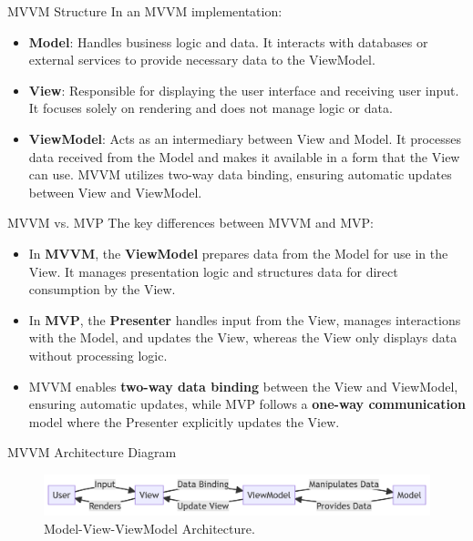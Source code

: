 \documentclass[aspectratio=169, table]{beamer}
\begin{document}
\begin{frame}[fragile]{MVVM Structure}
	\vspace{20pt}
	In an MVVM implementation:
	\begin{itemize}
		\item \textbf{Model}: Handles business logic and data. It interacts with databases or external services to provide necessary data to the ViewModel.
		\item \textbf{View}: Responsible for displaying the user interface and receiving user input. It focuses solely on rendering and does not manage logic or data.
		\item \textbf{ViewModel}: Acts as an intermediary between View and Model. It processes data received from the Model and makes it available in a form that the View can use. MVVM utilizes two-way data binding, ensuring automatic updates between View and ViewModel.
	\end{itemize}
\end{frame}

\begin{frame}[fragile]{MVVM vs. MVP}
	\vspace{20pt}
	The key differences between MVVM and MVP:
	\begin{itemize}
		\item In \textbf{MVVM}, the \textbf{ViewModel} prepares data from the Model for use in the View. It manages presentation logic and structures data for direct consumption by the View.
		\item In \textbf{MVP}, the \textbf{Presenter} handles input from the View, manages interactions with the Model, and updates the View, whereas the View only displays data without processing logic.
		\item MVVM enables \textbf{two-way data binding} between the View and ViewModel, ensuring automatic updates, while MVP follows a \textbf{one-way communication} model where the Presenter explicitly updates the View.
	\end{itemize}
\end{frame}

\begin{frame}[fragile]{MVVM Architecture Diagram}
	\vspace{20pt}
	\begin{figure}[h]
		\centering
		\includegraphics[width=\textwidth]{../images/mvvm.png}
		\caption{Model-View-ViewModel Architecture.}
		\label{fig:mvvm-architecture}
	\end{figure}
\end{frame}
\end{document}
